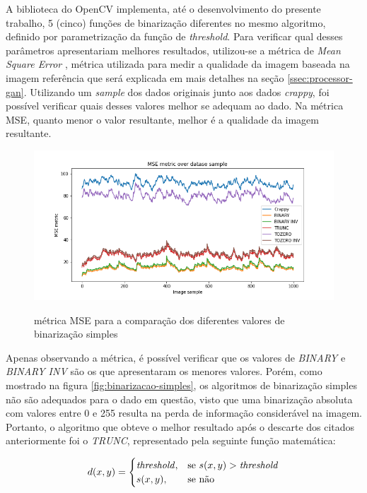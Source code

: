 A biblioteca do OpenCV implementa, até o desenvolvimento do presente trabalho, 5 (cinco) funções de binarização diferentes no mesmo algoritmo, definido por parametrização da função de \textit{threshold}. Para verificar qual desses parâmetros apresentariam melhores resultados, utilizou-se a métrica de \textit{Mean Square Error} \cite{mse-metric}, métrica utilizada para medir a qualidade da imagem baseada na imagem referência que será explicada em mais detalhes na seção \ref{ssec:processor-gan}. Utilizando um  \textit{sample} dos dados originais junto aos dados \textit{crappy}, foi possível verificar quais desses valores melhor se adequam ao dado. Na métrica MSE, quanto menor o valor resultante, melhor é a qualidade da imagem \cite{mse-metric} resultante.

\begin{figure}[H]
  \centering
  \caption{métrica MSE para a comparação dos diferentes valores de binarização simples}
  \includegraphics[scale=.63]{figuras/smoothed-binarization-test.png}
  \label{fig:smoothed-binarization-test}
\end{figure}

Apenas observando a métrica, é possível verificar que os valores de \textit{BINARY} e \textit{BINARY INV} são os que apresentaram os menores valores. Porém, como mostrado na figura \ref{fig:binarizacao-simples}, os algoritmos de binarização simples não são adequados para o dado em questão, visto que uma binarização absoluta com valores entre 0 e 255 resulta na perda de informação considerável na imagem. Portanto, o algoritmo que obteve o melhor resultado após o descarte dos citados anteriormente foi o \textit{TRUNC}, representado pela seguinte função matemática:

\begin{gather}
  d(x,y) =
  \begin{cases}
    \text{\textit{threshold}}, & \text{se } s(x,y) > \text{\textit{threshold}} \\
    s(x,y), & \text{se não}
  \end{cases}
  \label{math:threshold-trunc}
\end{gather}

